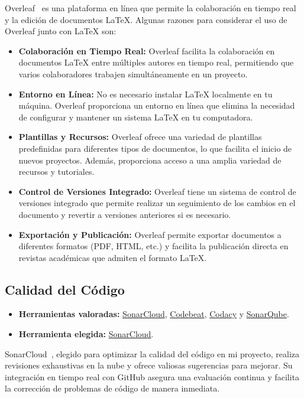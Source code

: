 Overleaf~\cite{misc:Overleaf} es una plataforma en línea que permite la colaboración en tiempo real y la edición de documentos LaTeX. Algunas razones para considerar el uso de Overleaf junto con LaTeX son:
\begin{itemize}
	\item \textbf{Colaboración en Tiempo Real:}
Overleaf facilita la colaboración en documentos LaTeX entre múltiples autores en tiempo real, permitiendo que varios colaboradores trabajen simultáneamente en un proyecto.

\item \textbf{Entorno en Línea:}
No es necesario instalar LaTeX localmente en tu máquina. Overleaf proporciona un entorno en línea que elimina la necesidad de configurar y mantener un sistema LaTeX en tu computadora.

\item \textbf{Plantillas y Recursos:}
Overleaf ofrece una variedad de plantillas predefinidas para diferentes tipos de documentos, lo que facilita el inicio de nuevos proyectos. Además, proporciona acceso a una amplia variedad de recursos y tutoriales.

\item \textbf{Control de Versiones Integrado:}
Overleaf tiene un sistema de control de versiones integrado que permite realizar un seguimiento de los cambios en el documento y revertir a versiones anteriores si es necesario.

\item \textbf{Exportación y Publicación:}
Overleaf permite exportar documentos a diferentes formatos (PDF, HTML, etc.) y facilita la publicación directa en revistas académicas que admiten el formato LaTeX.
\end{itemize}
\pagebreak

\subsection{Calidad del Código}
\begin{itemize}
	\item \textbf{Herramientas valoradas:} \href{https://www.sonarsource.com/products/sonarcloud/}{SonarCloud}, \href{https://codebeat.co/}{Codebeat}, \href{https://www.codacy.com/}{Codacy} y \href{https://www.sonarsource.com/products/sonarqube/}{SonarQube}.
    \item \textbf{Herramienta elegida:} \href{https://www.sonarsource.com/products/sonarcloud/}{SonarCloud}.
\end{itemize}
SonarCloud~\cite{misc:SonarCloud}, elegido para optimizar la calidad del código en mi proyecto, realiza revisiones exhaustivas en la nube y ofrece valiosas sugerencias para mejorar. Su integración en tiempo real con GitHub asegura una evaluación continua y facilita la corrección de problemas de código de manera inmediata. 

